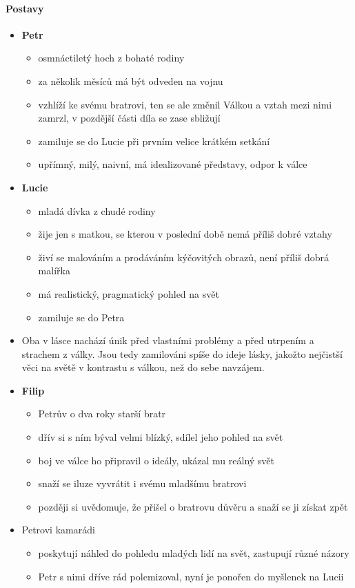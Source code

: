 \documentclass[10pt,a4paper]{article}
\begin{document}
\paragraph{Postavy}
\begin{itemize}
\item \textbf{Petr}
	\begin{itemize}
	\item osmnáctiletý hoch z bohaté rodiny
	\item za několik měsíců má být odveden na vojnu 
	\item vzhlíží ke svému bratrovi, ten se ale změnil Válkou a vztah mezi nimi zamrzl, v pozdější části díla se zase sbližují
	\item zamiluje se do Lucie při prvním velice krátkém setkání
	\item upřímný, milý, naivní, má idealizované představy, odpor k válce
	\end{itemize}
\item \textbf{Lucie}
	\begin{itemize}
	\item mladá dívka z chudé rodiny
	\item žije jen s matkou, se kterou v poslední době nemá příliš dobré vztahy
	\item živí se malováním a prodáváním kýčovitých obrazů, není příliš dobrá malířka
	\item má realistický, pragmatický pohled na svět
	\item zamiluje se do Petra
	\end{itemize}
\item Oba v lásce nachází únik před vlastními problémy a před utrpením a strachem z války. Jsou tedy zamilováni spíše do ideje lásky, jakožto nejčistší věci na světě v kontrastu s válkou, než do sebe navzájem. 
\item \textbf{Filip} 
	\begin{itemize}
	\item Petrův o dva roky starší bratr
	\item dřív si s ním býval velmi blízký, sdílel jeho pohled na svět
	\item boj ve válce ho připravil o ideály, ukázal mu reálný svět
	\item snaží se iluze vyvrátit i svému mladšímu bratrovi
	\item později si uvědomuje, že přišel o bratrovu důvěru a snaží se ji získat zpět
	\end{itemize}
\item Petrovi kamarádi
	\begin{itemize}
	\item poskytují náhled do pohledu mladých lidí na svět, zastupují různé názory
	\item Petr s nimi dříve rád polemizoval, nyní je ponořen do myšlenek na Lucii
	\end{itemize}
\end{itemize}
\end{document}
